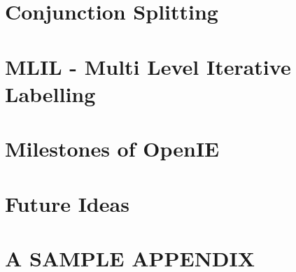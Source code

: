 \documentclass[BTech]{iitddiss}
\begin{document}
\chapter{Conjunction Splitting}
\label{chap:conjunction_splitting}



\chapter{MLIL - Multi Level Iterative Labelling}
\label{chap:mlil}



\chapter{Milestones of OpenIE}
\label{chap:milestones}



\chapter{Future Ideas}
\label{chap:future_ideas}



\appendix

\chapter{A SAMPLE APPENDIX}








\listofpapers

\end{document}
